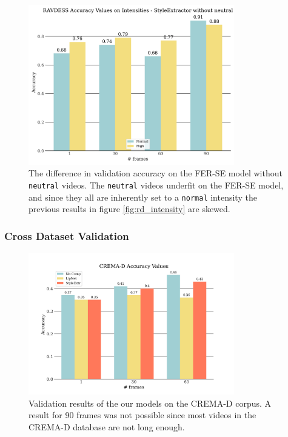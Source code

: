 \begin{figure}
    \centering
    \includegraphics[width=0.8\textwidth]{res/rd-intensities-busso-no-normal.png}
    \caption{The difference in validation accuracy on the FER-SE model without \texttt{neutral} videos. The \texttt{neutral} videos underfit on the FER-SE model, and since they all are inherently set to a \texttt{normal} intensity the previous results in figure \ref{fig:rd_intensity} are skewed.}
    \label{fig:busso_no_normal}
\end{figure}

\subsubsection{Cross Dataset Validation}
\label{sec:cross_dataset}

\begin{figure}
    \centering
    \includegraphics[width=0.8\textwidth]{res/CremaValidation.png}
    \caption{Validation results of the our models on the CREMA-D corpus. A result for 90 frames was not possible since most videos in the CREMA-D database are not long enough.}
    \label{fig:crema_val_lipnet}
\end{figure}

